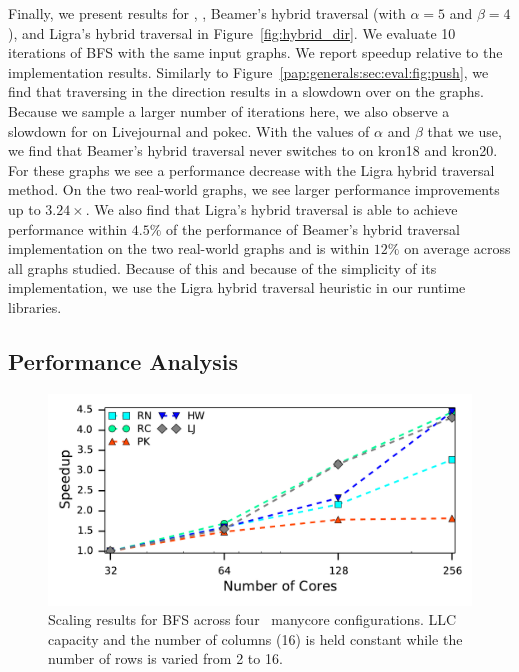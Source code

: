 \hybridresults
Finally, we present results for \push, \pull, Beamer's hybrid traversal (with $\alpha=5$ and $\beta=4$), and Ligra's hybrid traversal in Figure~\ref{fig:hybrid_dir}.
We evaluate 10 iterations of BFS with the same input graphs. 
We report speedup relative to the \push implementation results.
Similarly to Figure~\ref{pap:generals:sec:eval:fig:push}, we find that traversing in the \pull direction results in a slowdown over \push on the \kron graphs. 
Because we sample a larger number of iterations here, we also observe a slowdown for \pull on Livejournal and pokec. 
With the values of $\alpha$ and $\beta$ that we use, we find that Beamer's hybrid traversal never switches to \pull on kron18 and kron20. 
For these graphs we see a performance decrease with the Ligra hybrid traversal method.
On the two real-world graphs, we see larger performance improvements up to $3.24\times$.
We also find that Ligra's hybrid traversal is able to achieve performance within $4.5\%$ of the performance of Beamer's hybrid traversal implementation on the two real-world graphs and is within $12\%$ on average across all graphs studied.
Because of this and because of the simplicity of its implementation, we use the Ligra hybrid traversal heuristic in our runtime libraries.
 
\subsection{Performance Analysis}

\begin{figure}[h]
    \centering
    \includegraphics[scale = 0.6]{graphit-figures/hb-scaling-speedup.pdf}
    \caption{Scaling results for BFS across four \hb~manycore configurations. LLC capacity and the number of columns (16) is held constant while the number of rows is varied from 2 to 16.} 
    \label{pap:generals:sec:eval:fig:scaling}
\end{figure}

